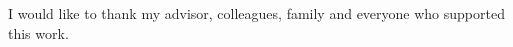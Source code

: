 \begin{agradecimentos}
I would like to thank my advisor, colleagues, family and everyone who supported this work.
\end{agradecimentos}
